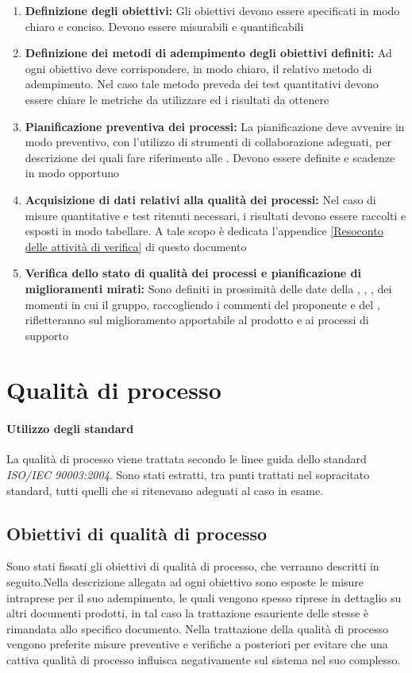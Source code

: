 \documentclass[12pt,a4paper]{article}
\begin{document}
\begin{enumerate}
	\item \textbf {Definizione degli obiettivi:} Gli obiettivi devono essere specificati in modo chiaro e conciso. Devono essere misurabili e quantificabili
	\item \textbf{Definizione dei metodi di adempimento degli obiettivi definiti:} Ad ogni obiettivo deve corrispondere, in modo chiaro, il relativo metodo di adempimento. Nel caso tale metodo preveda dei test quantitativi devono essere chiare le metriche da utilizzare ed i risultati da ottenere
	\item \textbf{Pianificazione preventiva dei processi:} La pianificazione deve avvenire in modo preventivo, con l'utilizzo di strumenti di collaborazione adeguati, per descrizione dei quali fare riferimento alle \NdP{}. Devono essere definite  e scadenze in modo opportuno
	\item \textbf{Acquisizione di dati relativi alla qualità dei processi:} Nel caso di misure quantitative e test ritenuti necessari, i risultati devono essere raccolti e esposti in modo tabellare. A tale scopo è dedicata l'appendice \ref{Resoconto delle attività di verifica} di questo documento
	\item \textbf{Verifica dello stato di qualità dei processi e pianificazione di miglioramenti mirati:}
	Sono definiti in prossimità delle date della \RR{}, \RA{}, \RP{}, \RQ{} dei momenti in cui il gruppo, raccogliendo i commenti del proponente \Zucchetti{} e del \Vardanega{}, rifletteranno sul miglioramento apportabile al prodotto e ai processi di supporto
\end{enumerate}

\newpage

\section{Qualità di processo}

\paragraph{Utilizzo degli standard}
La qualità di processo viene trattata secondo le linee guida dello standard \textit{ISO/IEC 90003:2004}. Sono stati estratti, tra punti trattati nel sopracitato standard, tutti quelli che si ritenevano adeguati al caso in esame.

\subsection{Obiettivi di qualità di processo}
Sono stati fissati gli obiettivi di qualità di processo, che verranno descritti in seguito.Nella descrizione allegata ad ogni obiettivo sono esposte le misure intraprese per il suo adempimento, le quali vengono spesso riprese in dettaglio su altri documenti prodotti, in tal caso la trattazione esauriente delle stesse è rimandata allo specifico documento. 
Nella trattazione della qualità di processo vengono preferite misure preventive e verifiche a posteriori per evitare che una cattiva qualità di processo influisca negativamente sul sistema nel suo complesso.
\end{document}
